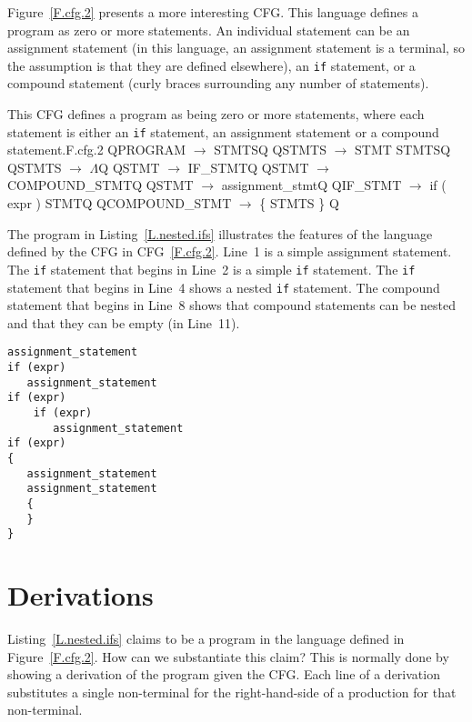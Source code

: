 \documentclass[letterpaper,12pt,openany,reqno]{book}%
\newcommand{\code}[1] {\lstinline[breaklines=yes,breakatwhitespace=yes]{#1}}
\newcommand{\cfgprod}[2] {{\ttfamily #1} $\rightarrow$ {\ttfamily #2}}
\begin{document}
Figure~\ref{F.cfg.2} presents a more interesting CFG. This language defines a program as zero or more statements. An individual statement can be an assignment statement (in this language, an assignment statement is a terminal, so the assumption is that they are defined elsewhere), an \code{if} statement, or a compound statement (curly braces surrounding any number of statements). 

\begin{cfg}{This CFG defines a program as being zero or more statements, where each statement is either an \code{if} statement, an assignment statement or a compound statement.}{F.cfg.2}
Q\cfgprod{PROGRAM}{STMTS}Q
Q\cfgprod{STMTS}{STMT STMTS}Q
Q\cfgprod{STMTS}{$\Lambda$}Q
Q\cfgprod{STMT}{IF\_STMT}Q
Q\cfgprod{STMT}{COMPOUND\_STMT}Q
Q\cfgprod{STMT}{assignment\_stmt}Q
Q\cfgprod{IF\_STMT} {if ( expr ) STMT}Q
Q\cfgprod{COMPOUND\_STMT} { \{ STMTS \} }Q
\end{cfg}

The program in Listing~\ref{L.nested.ifs} illustrates the features of the language defined by the CFG in CFG~\ref{F.cfg.2}. Line~1 is a simple assignment statement. The \code{if} statement that begins in Line~2 is a simple \code{if} statement. The \code{if} statement that begins in Line~4 shows a nested \code{if} statement. The compound statement that begins in Line~8 shows that compound statements can be nested and that they can be empty (in Line~11).

\begin{lstlisting}[caption={Sample program in the language defined by the CFG in CFG~\ref{F.cfg.2}},label=L.nested.ifs]
assignment_statement
if (expr)
   assignment_statement
if (expr)
    if (expr)
       assignment_statement
if (expr)
{
   assignment_statement
   assignment_statement
   {
   }
}
\end{lstlisting}

\section{Derivations}

Listing~\ref{L.nested.ifs} claims to be a program in the language defined in Figure~\ref{F.cfg.2}. How can we substantiate this claim? This is normally done by showing a derivation of the program given the CFG. Each line of a derivation substitutes a single non-terminal for the right-hand-side of a production for that non-terminal. 
\end{document}

